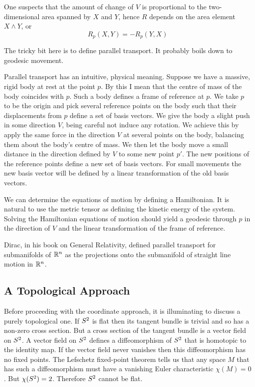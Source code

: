 \documentclass[11pt, oneside]{article}
\begin{document}
One suspects that the amount of change of $V$ is proportional to the two-dimensional area spanned by $X$ and $Y$, hence $R$ depends
on the area element $X \wedge Y$, or 
\begin{equation}
	R_p(X,Y) = -R_p(Y,X)
\end{equation}

The tricky bit here is to define parallel transport.
It probably boils down to geodesic movement.

Parallel transport has an intuitive, physical meaning.
Suppose we have a massive, rigid body at rest at the point $p$.
By this I mean that the centre of mass of the body coincides with $p$.
Such a body defines a frame of reference at $p$.
We take $p$ to be the origin and pick several reference points on the body such that their displacements from $p$ define a set of basis vectors.
We give the body a slight push in some direction $V$, being careful not induce any rotation.
We achieve this by apply the same force in the direction $V$ at several points on the body, balancing them about the body's centre of mass.
We then let the body move a small distance in the direction defined by $V$ to some new point $p'$.
The new positions of the reference points define a new set of basis vectors.
For small movements the new basis vector will be defined by a linear transformation of the old basis vectors.

We can determine the equations of motion by defining a Hamiltonian.
It is natural to use the metric tensor as defining the kinetic energy of the system.
Solving the Hamiltonian equations of motion should yield a geodesic through $p$ in the direction of $V$ and the linear transformation of
the frame of reference.

Dirac, in his book on General Relativity, defined parallel transport for submanifolds of  $\mathbb{R}^n$ as the projections onto the submanifold of
straight line motion in $\mathbb{R}^n$.

\subsection{A Topological Approach}

Before proceeding with the coordinate approach, it is illuminating to discuss a purely topological one.
If $S^2$ is flat then its tangent bundle is trivial and so has a non-zero cross section.
But a cross section of the tangent bundle is a vector field on $S^2$.
A vector field on $S^2$ defines a diffeomorphism of $S^2$ that is homotopic to the identity map.
If the vector field never vanishes then this diffeomorphism has no fixed points.
The Lefschetz fixed-point theorem tells us that any space $M$ that has such a diffeomorphism must have a vanishing Euler characteristic
$\chi(M) = 0$. But $\chi(S^2) = 2$. Therefore $S^2$ cannot be flat.
\end{document}
